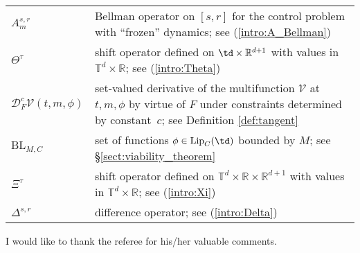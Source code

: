 \documentclass[a4paper,12pt]{article}
\newcommand{\tdr}{\mathbb{T}^{d}\times\mathbb{R}}
\begin{document}
\begin{longtable}{l p{12.0cm}}
	$A^{s,r}_{m}$ & Bellman operator on $[s,r]$ for the control problem with ``frozen'' dynamics; see (\ref{intro:A_Bellman})\\
	$\Theta^\tau$ & shift operator defined on $\td\times\mathbb{R}^{d+1}$ with values in $\tdr$; see (\ref{intro:Theta})\\
	$\mathcal{D}^c_F\mathcal{V}(t,m,\phi)$ & set-valued derivative of the multifunction $\mathcal{V}$ at $t,m,\phi$ by virtue of $F$ under constraints determined by constant~$c$; see Definition \ref{def:tangent}\\
	$\mathrm{BL}_{M,C}$ & set of functions $\phi\in\mathrm{Lip}_C(\td)$ bounded by $M$; see \S \ref{sect:viability_theorem}\\
	$\Xi^\tau$ & shift operator defined on $\tdr\times\mathbb{R}^{d+1}$ with values in $\tdr$; see (\ref{intro:Xi}) \\ 
	$\Delta^{s,r}$ & difference operator; see (\ref{intro:Delta}) 
	
\end{longtable}


\begin{acknowledgement}
	I would like to thank the referee for his/her valuable comments.
\end{acknowledgement}



 
\end{document}
